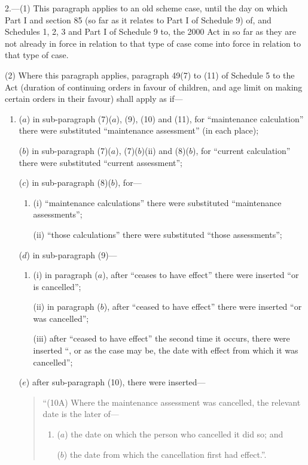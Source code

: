 \documentclass[12pt,a4paper]{article}
\begin{document}
\medskip

2.---(1)  This paragraph applies to an old scheme case, until the day on which Part I and section 85 (so far as it relates to Part I of Schedule 9) of, and Schedules 1, 2, 3 and Part I of Schedule 9 to, the 2000 Act in so far as they are not already in force in relation to that type of case come into force in relation to that type of case.

(2) Where this paragraph applies, paragraph 49(7) to (11) of Schedule 5 to the Act (duration of continuing orders in favour of children, and age limit on making certain orders in their favour) shall apply as if—
\begin{enumerate}\item[]
($a$) in sub-paragraph (7)($a$), (9), (10) and (11), for “maintenance calculation” there were substituted “maintenance assessment” (in each place);

($b$) in sub-paragraph (7)($a$), (7)($b$)(ii)  and (8)($b$), for “current calculation” there were substituted “current assessment”;

($c$) in sub-paragraph (8)($b$), for—
\begin{enumerate}\item[]
(i) “maintenance calculations” there were substituted “maintenance assessments”;

(ii) “those calculations” there were substituted “those assessments”;
\end{enumerate}

($d$) in sub-paragraph (9)—
\begin{enumerate}\item[]
(i) in paragraph ($a$), after “ceases to have effect” there were inserted “or is cancelled”;

(ii) in paragraph ($b$), after “ceased to have effect” there were inserted “or was cancelled”;

(iii) after “ceased to have effect” the second time it occurs, there were inserted “, or as the case may be, the date with effect from which it was cancelled”;
\end{enumerate}

($e$) after sub-paragraph (10), there were inserted—
\begin{quotation}
“(10A) Where the maintenance assessment was cancelled, the relevant date is the later of—
\begin{enumerate}\item[]
($a$) the date on which the person who cancelled it did so; and

($b$) the date from which the cancellation first had effect.”.
\end{enumerate}
\end{quotation}
\end{enumerate}
\end{document}
